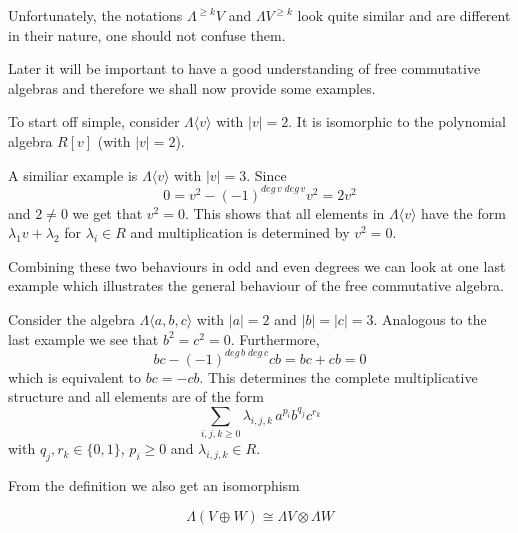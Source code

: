 Unfortunately, the notations $\Lambda^{\geq k} V$ and ${\Lambda V}^{\geq k}$  look 
quite similar and are different in their nature, one should not confuse them.


Later it will be important to have a good understanding of free commutative algebras and therefore
we shall now provide some examples.

\begin{Example}
\label{ex:FreeCommutativeEvenDegrees}
 To start off simple, consider $\Lambda \langle v \rangle$ with $|v| = 2$. 
 It is isomorphic to the polynomial algebra $R[v]$ (with $|v| = 2$).
\end{Example}

\begin{Example}
\label{ex:FreeCommutativeOddDegrees}
 A similiar example is $\Lambda \langle v \rangle$ with $|v| = 3$. Since 
 $$0 = v^2 - (-1)^{deg \, v \; deg \, v} v^2 = 2 v^2$$
 and $2 \neq 0$ we get that $v^2 = 0$. This shows that all elements in $\Lambda \langle v \rangle$
 have the form $\lambda_1 v + \lambda_2$ for $\lambda_i \in R$ and multiplication is determined by $v^2 = 0$.
\end{Example}

Combining these two behaviours in odd and even degrees we can look at one last example which
illustrates the general behaviour of the free commutative algebra.

\begin{Example}
 Consider the algebra $\Lambda \langle a,b,c \rangle$ with $|a| = 2$ and $|b| = |c| = 3$.
 Analogous to the last example we see that $b^2 = c^2 = 0$. Furthermore,
 $$ bc - (-1)^{deg \, b \; deg \, c} cb = bc + cb = 0$$
 which is equivalent to $bc = - cb$. This determines the complete multiplicative structure 
 and all elements are of the form 
 $$ \sum_{i,j,k \geq 0} \lambda_{i,j,k} \, a^{p_i} b^{q_j} c^{r_k}$$
 with  $q_j, r_k \in \lbrace 0,1 \rbrace$, $p_i \geq 0$ and $\lambda_{i,j,k} \in R$.
\end{Example}

\begin{Remark}
\label{rem:FreeCommutativeSplits}
From the definition we also get an isomorphism 

$$ \Lambda ( V \oplus W) \cong \Lambda V \otimes \Lambda W $$

\end{Remark}